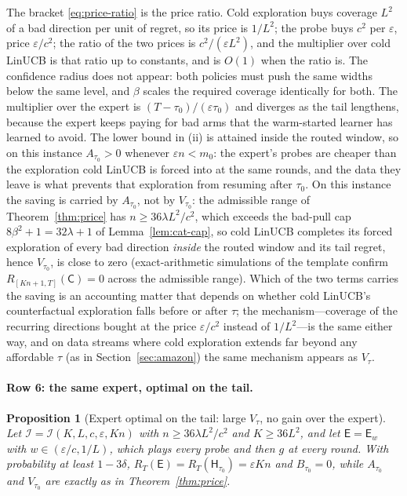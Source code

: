 \documentclass{article}
\newtheorem{proposition}{Proposition}
\theoremstyle{definition}
\theoremstyle{remark}
\newcommand{\eps}{\varepsilon}
\theoremstyle{remark}
\newcommand{\Cold}{\mathsf{C}}
\newcommand{\Exp}{\mathsf{E}}
\newcommand{\Hyb}{\mathsf{H}}
\begin{document}
The bracket \eqref{eq:price-ratio} is the price ratio. Cold exploration buys
coverage $L^2$ of a bad direction per unit of regret, so its price is $1/L^2$;
the probe buys $c^2$ per $\eps$, price $\eps/c^2$; the ratio of the two prices
is $c^2/(\eps L^2)$, and the multiplier over cold LinUCB is that ratio up to
constants, and is $O(1)$ when the ratio is. The confidence radius does not
appear: both policies must push the same widths below the same level, and
$\beta$ scales the required coverage identically for both. The multiplier
over the expert is $(T-\tau_0)/(\eps\tau_0)$ and diverges as the tail
lengthens, because the expert keeps paying for bad arms that the warm-started
learner has learned to avoid. The lower bound in (ii) is attained inside the
routed window, so on this instance $A_{\tau_0}>0$ whenever $\eps n<m_0$: the
expert's probes are cheaper than the exploration cold LinUCB is forced into
at the same rounds, and the data they leave is what prevents that exploration
from resuming after $\tau_0$. On this instance the saving is carried by
$A_{\tau_0}$, not by $V_{\tau_0}$: the admissible range of
Theorem~\ref{thm:price} has $n\ge36\lambda L^2/c^2$, which exceeds the
bad-pull cap $8\beta^2+1=32\lambda+1$ of Lemma~\ref{lem:cat-cap}, so cold
LinUCB completes its forced exploration of every bad direction \emph{inside}
the routed window and its tail regret, hence $V_{\tau_0}$, is close to zero
(exact-arithmetic simulations of the template confirm
$R_{[Kn+1,T]}(\Cold)=0$ across the admissible range). Which of the two terms
carries the saving is an accounting matter that depends on whether cold
LinUCB's counterfactual exploration falls before or after $\tau$; the
mechanism---coverage of the recurring directions bought at the price
$\eps/c^2$ instead of $1/L^2$---is the same either way, and on data streams
where cold exploration extends far beyond any affordable $\tau$ (as in
Section~\ref{sec:amazon}) the same mechanism appears as $V_\tau$.


\paragraph{Row 6: the same expert, optimal on the tail.}
\begin{proposition}[Expert optimal on the tail: large $V_\tau$, no gain over the expert]
\label{prop:cat-tail}
Let $\mathcal I=\mathcal I(K,L,c,\eps,Kn)$ with $n\ge36\lambda L^2/c^2$ and
$K\ge36L^2$, and let $\Exp=\Exp_w$ with $w\in(\eps/c,1/L)$, which plays every
probe and then $g$ at every round. With probability at least $1-3\delta$,
$R_T(\Exp)=R_T(\Hyb_{\tau_0})=\eps Kn$ and $B_{\tau_0}=0$, while $A_{\tau_0}$
and $V_{\tau_0}$ are exactly as in Theorem~\ref{thm:price}.
\end{proposition}
\end{document}
